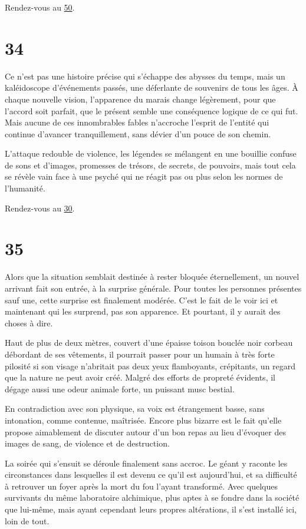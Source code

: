 \documentclass{report}
\newcommand{\gsection}[1]{
    \section{#1}
    \label{section-#1}
}
\newcommand{\glink}[1]{\hyperref[section-#1]{#1}}
\begin{document}
Rendez-vous au \glink{50}.

\gsection{34}

Ce n'est pas une histoire précise qui s'échappe des abysses du temps, mais un kaléidoscope d'événements passés, une déferlante de souvenirs de tous les âges. À chaque nouvelle vision, l'apparence du marais change légèrement, pour que l'accord soit parfait, que le présent semble une conséquence logique de ce qui fut. Mais aucune de ces innombrables fables n'accroche l'esprit de l'entité qui continue d'avancer tranquillement, sans dévier d'un pouce de son chemin.

L'attaque redouble de violence, les légendes se mélangent en une bouillie confuse de sons et d'images, promesses de trésors, de secrets, de pouvoirs, mais tout cela se révèle vain face à une psyché qui ne réagit pas ou plus selon les normes de l'humanité.

Rendez-vous au \glink{30}.

\gsection{35}

Alors que la situation semblait destinée à rester bloquée éternellement, un nouvel arrivant fait son entrée, à la surprise générale. Pour toutes les personnes présentes sauf une, cette surprise est finalement modérée. C'est le fait de le voir ici et maintenant qui les surprend, pas son apparence. Et pourtant, il y aurait des choses à dire.

Haut de plus de deux mètres, couvert d'une épaisse toison bouclée noir corbeau débordant de ses vêtements, il pourrait passer pour un humain à très forte pilosité si son visage n'abritait pas deux yeux flamboyants, crépitants, un regard que la nature ne peut avoir créé. Malgré des efforts de propreté évidents, il dégage aussi une odeur animale forte, un puissant musc bestial.

En contradiction avec son physique, sa voix est étrangement basse, sans intonation, comme contenue, maîtrisée. Encore plus bizarre est le fait qu'elle propose aimablement de discuter autour d'un bon repas au lieu d'évoquer des images de sang, de violence et de destruction.

La soirée qui s'ensuit se déroule finalement sans accroc. Le géant y raconte les circonstances dans lesquelles il est devenu ce qu'il est aujourd'hui, et sa difficulté à retrouver un foyer après la mort du fou l'ayant transformé. Avec quelques survivants du même laboratoire alchimique, plus aptes à se fondre dans la société que lui-même, mais ayant cependant leurs propres altérations, il s'est installé ici, loin de tout.
\end{document}
